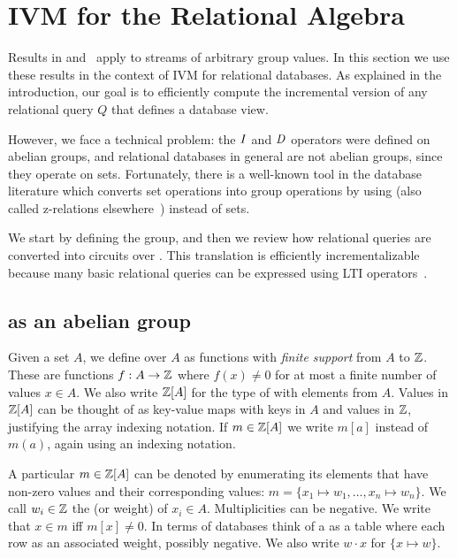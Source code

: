 \section{IVM for the Relational Algebra}\label{sec:relational}

Results in  and~
apply to streams of arbitrary group values.  In this
section we use these results in the context of IVM for
relational databases.  As explained in the introduction, our goal is to
efficiently compute the incremental version of any relational query $Q$
that defines a database view.

However, we face a technical problem: the $\mathit{I}$ and $\mathit{D}$ operators were
defined on abelian groups, and relational databases in general are 
not abelian groups, since they operate on sets.  Fortunately, 
there is a well-known tool in the database literature
which converts set operations into group operations by using \zrs
(also called z-relations elsewhere~\cite{green-tcs11}) instead of sets.

We start by defining the \zrs group, and then we review how 
relational queries are converted into \dbsp circuits  over \zrs.  
This translation is efficiently incrementalizable because
many basic relational queries can be expressed using LTI \zr operators~.

\subsection{\zrs as an abelian group}

Given a set $A$, we define  
over $A$ as functions with \emph{finite support} from $A$ to $\mathbb{Z}$.  
These are functions $f: A \rightarrow \mathbb{Z}$ where 
$f(x) \not= 0$ for at most a finite number of values $x \in A$.
We also write $\mathbb{Z}[A]$ for the type of \zrs with elements from $A$.
Values in $\mathbb{Z}[A]$ can be thought of as key-value maps with 
keys in $A$ and values in $\mathbb{Z}$, justifying the array indexing notation.  
If $m \in \mathbb{Z}[A]$ we write $m[a]$ instead of $m(a)$, again using
an indexing notation.  

A particular \zr $m \in \mathbb{Z}[A]$ can be denoted by enumerating its
elements that have non-zero values and their corresponding values: 
$m = \{ x_1 \mapsto w_1, \dots, x_n \mapsto w_n \}$.  
We call $w_i \in \mathbb{Z}$ the  (or weight)
of $x_i \in A$.  Multiplicities can be negative.  
We write that $x \in m$ iff $m[x] \not= 0$.
In terms of databases think of a \zr as a table
where each row as an associated weight, possibly negative.
We also write $w \cdot x$ for $\{ x \mapsto w \}$.


